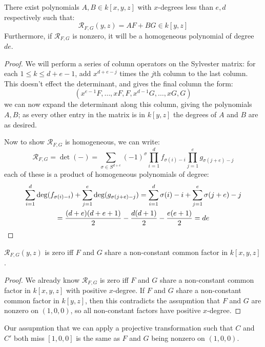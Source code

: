 \documentclass{article}
\begin{document}
\begin{proposition}
    There exist polynomials $A,B\in k[x,y,z]$ with $x$-degrees less than $e,d$ respectively such that: \[
    \mathcal{R}_{F,G}(y,z) = AF + BG \in k[y,z]
    \] Furthermore, if $\mathcal{R}_{F,G}$ is nonzero, it will be a homogeneous polynomial of degree $de$.
    \begin{proof}
        We will perform a series of column operators on the Sylvester matrix: for each $1\leq k \leq d+e-1$, add $x^{d+e-j}$ times the $j$th column to the last column. This doesn't effect the determinant, and gives the final column the form: \[
        (x^{e-1}F, \ldots, xF, F, x^{d-1}G, \ldots, xG, G)
        \] we can now expand the determinant along this column, giving the polynomials $A,B$; as every other entry in the matrix is in $k[y,z]$ the degrees of $A$ and $B$ are as desired.

        Now to show $\mathcal{R}_{F,G}$ is homogeneous, we can write: \[
            \mathcal{R}_{F,G} = \det(-) = \sum_{\sigma\in S^{d+e}}(-1)^\sigma\prod_{i=1}^df_{\sigma(i)-i}\prod_{j=1}^eg_{\sigma(j+e)-j}
        \] each of these is a product of homogeneous polynomials of degree: \begin{gather*}
            \sum_{i=1}^d\deg(f_{\sigma(i)-i}) + \sum_{j=1}^e \deg(g_{\sigma(j+e)-j}) = \sum_{i=1}^d \sigma(i)-i + \sum_{j=1}^e \sigma(j+e)-j \\
             = \frac{(d+e)(d+e+1)}{2} - \frac{d(d+1)}{2} - \frac{e(e+1)}{2} = de\qedhere
        \end{gather*}
    \end{proof}
\end{proposition}

\begin{proposition}
    $\mathcal{R}_{F,G}(y,z)$ is zero iff $F$ and $G$ share a non-constant common factor in $k[x,y,z]$.\begin{proof}
        We already know $\mathcal{R}_{F,G}$ is zero iff $F$ and $G$ share a non-constant common factor in $k[x,y,z]$ with positive $x$-degree. If $F$ and $G$ share a non-constant common factor in $k[y,z]$, then this contradicts the assupmtion that $F$ and $G$ are nonzero on $(1,0,0)$, so all non-constant factors have positive $x$-degree.
    \end{proof}
\end{proposition}

Our assupmtion that we can apply a projective transformation such that $C$ and $C'$ both miss $[1,0,0]$ is the same as $F$ and $G$ being nonzero on $(1,0,0)$.
\end{document}
